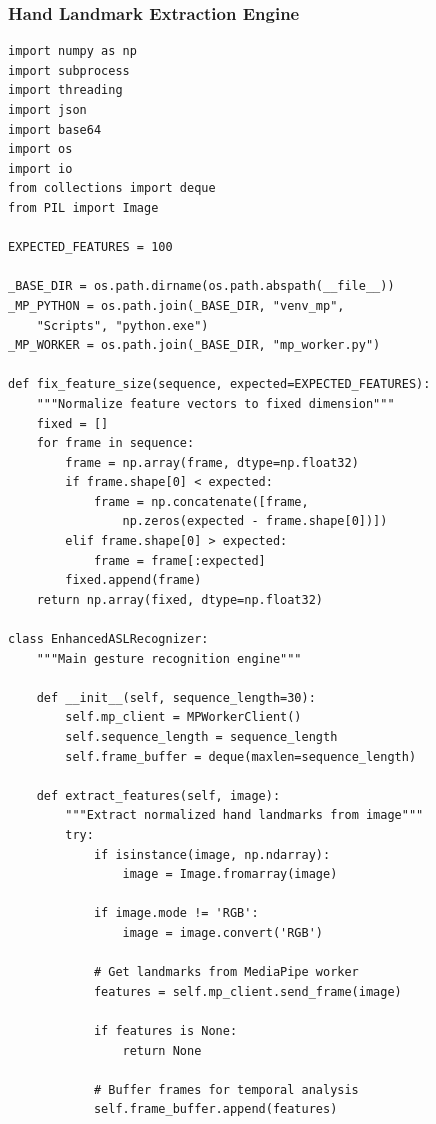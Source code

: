 \documentclass[11pt,a4paper,twoside]{report}
\begin{document}
\subsubsection{Hand Landmark Extraction Engine}
\label{subsubsec:hand-extraction}

\begin{lstlisting}[style=python, caption={Hand landmark extraction and feature normalization engine}, label=lst:recognizer]
import numpy as np
import subprocess
import threading
import json
import base64
import os
import io
from collections import deque
from PIL import Image

EXPECTED_FEATURES = 100

_BASE_DIR = os.path.dirname(os.path.abspath(__file__))
_MP_PYTHON = os.path.join(_BASE_DIR, "venv_mp", 
    "Scripts", "python.exe")
_MP_WORKER = os.path.join(_BASE_DIR, "mp_worker.py")

def fix_feature_size(sequence, expected=EXPECTED_FEATURES):
    """Normalize feature vectors to fixed dimension"""
    fixed = []
    for frame in sequence:
        frame = np.array(frame, dtype=np.float32)
        if frame.shape[0] < expected:
            frame = np.concatenate([frame, 
                np.zeros(expected - frame.shape[0])])
        elif frame.shape[0] > expected:
            frame = frame[:expected]
        fixed.append(frame)
    return np.array(fixed, dtype=np.float32)

class EnhancedASLRecognizer:
    """Main gesture recognition engine"""

    def __init__(self, sequence_length=30):
        self.mp_client = MPWorkerClient()
        self.sequence_length = sequence_length
        self.frame_buffer = deque(maxlen=sequence_length)

    def extract_features(self, image):
        """Extract normalized hand landmarks from image"""
        try:
            if isinstance(image, np.ndarray):
                image = Image.fromarray(image)
            
            if image.mode != 'RGB':
                image = image.convert('RGB')

            # Get landmarks from MediaPipe worker
            features = self.mp_client.send_frame(image)
            
            if features is None:
                return None

            # Buffer frames for temporal analysis
            self.frame_buffer.append(features)
            

\end{lstlisting}
\end{document}
